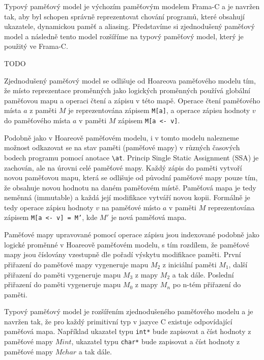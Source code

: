 
Typový paměťový model je výchozím paměťovým modelem Frama\mbox{-}C
a je navržen tak, aby byl schopen správně reprezentovat chování programů,
které obsahují ukazatele, dynamickou paměť a aliasing.
Představíme si zjednodušený paměťový model a následně tento model rozšíříme na typový paměťový model,
který je použitý ve Frama\mbox{-}C\@.


TODO




Zjednodušený paměťový model se odlišuje od Hoareova paměťového modelu tím,
že místo reprezentace proměnných jako logických proměnných
používá globální paměťovou mapu a operaci čtení a zápisu v této mapě.
Operace čtení paměťového místa $a$ z paměti $M$ je reprezentována zápisem \texttt{M[a]},
a operace zápisu hodnoty $v$ do paměťového místa $a$ v paměti $M$ zápisem \texttt{M[a <- v]}.


Podobně jako v Hoareově paměťovém modelu,
i v tomto modelu nalezneme možnost odkazovat se na stav paměti (paměťové mapy)
v různých časových bodech programu pomocí anotace \texttt{\textbackslash at}.
Princip Single Static Assignment (SSA) je zachován, ale na úrovni celé paměťové mapy.
Každý zápis do paměti vytvoří novou paměťovou mapu,
která se odlišuje od původní paměťové mapy pouze tím,
že obsahuje novou hodnotu na daném paměťovém místě.
Paměťová mapa je tedy neměnná (immutable) a každá její modifikace vytváří novou kopii.
Formálně je tedy operace zápisu hodnoty $v$ na paměťové místo $a$ v paměti $M$ reprezentována zápisem
\texttt{M[a <- v] = M'}, kde $M'$ je nová paměťová mapa.

Paměťové mapy upravované pomocí operace zápisu jsou indexované podobně jako logické proměnné v Hoareově paměťovém modelu,
s tím rozdílem, že paměťové mapy jsou číslovány vzestupně dle pořadí výskytu modifikace paměti.
První přiřazení do paměťové mapy vygeneruje mapu $M_2$ z iniciální paměti $M_1$,
další přiřazení do paměti vygeneruje mapu $M_3$ z mapy $M_2$ a tak dále.
Poslední přiřazení do paměti vygeneruje mapu $M_0$ z mapy $M_n$ po n-tém přiřazení do paměti.

Typový paměťový model je rozšířením zjednodušeného paměťového modelu
a je navržen tak, že pro každý primitivní typ v jazyce C existuje odpovídající paměťová mapa.
Například ukazatel typu \texttt{int*} bude zapisovat a číst hodnoty z paměťové mapy $Mint$,
ukazatel typu \texttt{char*} bude zapisovat a číst hodnoty z paměťové mapy $Mchar$ a tak dále.

